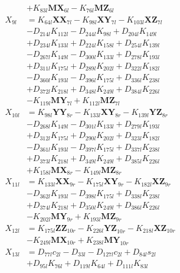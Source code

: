 \begin{multicols}{2}
\begin{align}
&+ K_{83l}\mathbf{MX}_{6l} - K_{76l}\mathbf{MZ}_{6l} \nonumber \\
X_{9l} &= K_{64l}\mathbf{XX}_{7l} - K_{98l}\mathbf{XY}_{7l} - K_{103l}\mathbf{XZ}_{7l}  \nonumber \\
&- D_{214l}K_{112l} - D_{244l}K_{98l} + D_{204l}K_{149l}  \nonumber \\
&+ D_{234l}K_{133l} + D_{224l}K_{158l} + D_{254l}K_{139l}  \nonumber \\
&- D_{267l}K_{149l} - D_{300l}K_{133l} + D_{278l}K_{193l}  \nonumber \\
&+ D_{311l}K_{175l} + D_{289l}K_{202l} + D_{322l}K_{182l}  \nonumber \\
&- D_{360l}K_{193l} - D_{396l}K_{175l} + D_{336l}K_{238l}  \nonumber \\
&+ D_{372l}K_{218l} + D_{348l}K_{249l} + D_{384l}K_{226l}  \nonumber \\
&- K_{119l}\mathbf{MY}_{7l} + K_{112l}\mathbf{MZ}_{7l} \nonumber \\
X_{10l} &= K_{98l}\mathbf{YY}_{8r} - K_{133l}\mathbf{XY}_{8r} - K_{139l}\mathbf{YZ}_{8r}  \nonumber \\
&- D_{268l}K_{149l} - D_{301l}K_{133l} + D_{279l}K_{193l}  \nonumber \\
&+ D_{312l}K_{175l} + D_{290l}K_{202l} + D_{323l}K_{182l}  \nonumber \\
&- D_{361l}K_{193l} - D_{397l}K_{175l} + D_{337l}K_{238l}  \nonumber \\
&+ D_{373l}K_{218l} + D_{349l}K_{249l} + D_{385l}K_{226l}  \nonumber \\
&+ K_{158l}\mathbf{MX}_{8r} - K_{149l}\mathbf{MZ}_{8r} \nonumber \\
X_{11l} &= K_{133l}\mathbf{XX}_{9r} - K_{175l}\mathbf{XY}_{9r} - K_{182l}\mathbf{XZ}_{9r}  \nonumber \\
&- D_{362l}K_{193l} - D_{398l}K_{175l} + D_{338l}K_{238l}  \nonumber \\
&+ D_{374l}K_{218l} + D_{350l}K_{249l} + D_{386l}K_{226l}  \nonumber \\
&- K_{202l}\mathbf{MY}_{9r} + K_{193l}\mathbf{MZ}_{9r} \nonumber \\
X_{12l} &= K_{175l}\mathbf{ZZ}_{10r} - K_{226l}\mathbf{YZ}_{10r} - K_{218l}\mathbf{XZ}_{10r}  \nonumber \\
&- K_{249l}\mathbf{MX}_{10r} + K_{238l}\mathbf{MY}_{10r} \nonumber \\
X_{13l} &= D_{77l}c_{2l} - D_{33l} - D_{127l}c_{2l} + D_{84l}s_{2l}  \nonumber \\
&+ D_{95l}K_{76l} + D_{119l}K_{64l} + D_{111l}K_{83l}  \nonumber \\

\end{align}
\end{multicols}
